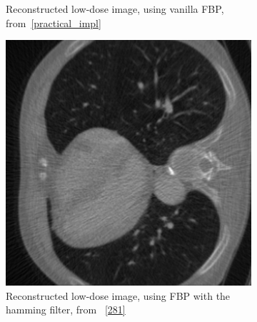 \documentclass[12pt,a4paper]{article}
\begin{document}
\begin{figure}[h!]
\begin{subfigure}[t]{\size\textwidth}
        \caption{Reconstructed low-dose image, using vanilla FBP, from~\ref{practical_impl}}
        \label{fig:windowII+l2+slow50_vanilla}
    \end{subfigure}
    \hfill
    \begin{subfigure}[t]{\size\textwidth}
        \centering
        \includegraphics[width=\textwidth]{Bachelorthesis//UsedImages/hamming_50.png}
        \caption{Reconstructed low-dose image, using FBP with the hamming filter, from ~\ref{281}}
        \label{fig:windowII+l2+slow50_hamming}
    \end{subfigure}
    \hfill
    \begin{subfigure}[t]{\size\textwidth}
        \centering

\end{subfigure}
\end{figure}
\end{document}
